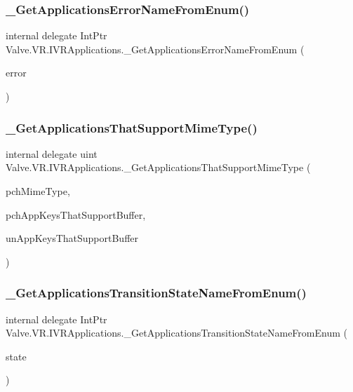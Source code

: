 \subsubsection{\texorpdfstring{\_GetApplicationsErrorNameFromEnum()}{\_GetApplicationsErrorNameFromEnum()}}
{\footnotesize\ttfamily internal delegate Int\+Ptr Valve.\+V\+R.\+I\+V\+R\+Applications.\+\_\+\+Get\+Applications\+Error\+Name\+From\+Enum (\begin{DoxyParamCaption}\item[{\mbox{\hyperlink{namespace_valve_1_1_v_r_a3488adab8a219b579fcee50f4e63a8b6}{E\+V\+R\+Application\+Error}}}]{error }\end{DoxyParamCaption})}

\mbox{\label{struct_valve_1_1_v_r_1_1_i_v_r_applications_a69203996ca75bee54e6ff4b68d774618}} 
\subsubsection{\texorpdfstring{\_GetApplicationsThatSupportMimeType()}{\_GetApplicationsThatSupportMimeType()}}
{\footnotesize\ttfamily internal delegate uint Valve.\+V\+R.\+I\+V\+R\+Applications.\+\_\+\+Get\+Applications\+That\+Support\+Mime\+Type (\begin{DoxyParamCaption}\item[{string}]{pch\+Mime\+Type,  }\item[{System.\+Text.\+String\+Builder}]{pch\+App\+Keys\+That\+Support\+Buffer,  }\item[{uint}]{un\+App\+Keys\+That\+Support\+Buffer }\end{DoxyParamCaption})}

\mbox{\label{struct_valve_1_1_v_r_1_1_i_v_r_applications_a84090171964167a37149043d7834077b}} 
\subsubsection{\texorpdfstring{\_GetApplicationsTransitionStateNameFromEnum()}{\_GetApplicationsTransitionStateNameFromEnum()}}
{\footnotesize\ttfamily internal delegate Int\+Ptr Valve.\+V\+R.\+I\+V\+R\+Applications.\+\_\+\+Get\+Applications\+Transition\+State\+Name\+From\+Enum (\begin{DoxyParamCaption}\item[{\mbox{\hyperlink{namespace_valve_1_1_v_r_af00430caae64a19e9ad612ac01a208c0}{E\+V\+R\+Application\+Transition\+State}}}]{state }\end{DoxyParamCaption})}

